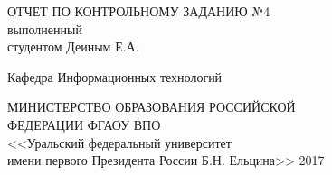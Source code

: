 \documentclass[a4paper,14pt]{book}
\begin{document}
    \begin{titlepage}
        \begin{center}
            ОТЧЕТ ПО КОНТРОЛЬНОМУ ЗАДАНИЮ №4 \\
            выполненный \\
            студентом Деиным Е.А.\par
            \vfill
            Кафедра Информационных технологий\par
            \vfill
            МИНИСТЕРСТВО ОБРАЗОВАНИЯ РОССИЙСКОЙ\\ \vspace{0.1cm}ФЕДЕРАЦИИ
            ФГАОУ ВПО\\ \vspace{0.1cm} <<Уральский федеральный университет\\ \vspace{0.1cm} имени первого Президента России Б.Н. Ельцина>>
            \vspace{0.5cm}
            2017
        \end{center}
    \end{titlepage}
    \setcounter{page}{2}
    
    \linespread{1.5}     
    
\end{document}
